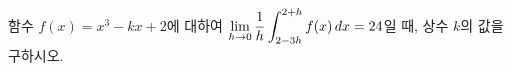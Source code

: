 함수 $f(x)=x^3-kx+2$에 대하여 $\displaystyle\lim_{h\to 0}\dfrac{1}{h}\int_{2-3h}^{2+h}f(x)\mkern3mu dx=24$일 때, 상수 $k$의 값을 구하시오.
